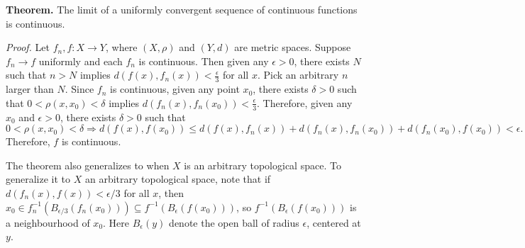 \documentclass[12pt]{article}
\begin{document}
{\bf Theorem.} The limit of a uniformly convergent sequence of continuous functions is continuous. 

\emph{Proof.} Let $f_n,f:X\rightarrow Y$, where $(X,\rho)$ and $(Y,d)$ are metric spaces. Suppose $f_n \rightarrow f$ uniformly and each $f_n$ is continuous. Then given any $\epsilon>0$, there exists $N$ such that $n>N$ implies $d(f(x),f_{n}(x)) < \frac{\epsilon}{3}$ for all $x$. Pick an arbitrary $n$ larger than $N$. Since $f_n$ is continuous, given any point $x_0$, there exists $\delta>0$ such that $0<\rho(x,x_0)<\delta$ implies $d(f_n(x), f_n(x_0))<\frac{\epsilon}{3}$. Therefore, given any $x_0$ and $\epsilon>0$, there exists $\delta>0$ such that 
\[0<\rho(x,x_0)<\delta\Rightarrow d(f(x),f(x_0)) \leq d(f(x),f_n(x)) + d(f_n(x),f_n(x_0)) + d(f_n(x_0),f(x_0)) < \epsilon.\]
Therefore, $f$ is continuous.

The theorem also generalizes to when $X$ is an arbitrary topological space. To generalize it to $X$ an arbitrary topological space, note that if $d(f_n(x),f(x))< \epsilon/3$ for all $x$, then
$x_0\in f_n^{-1}(B_{\epsilon/3}(f_n(x_0)))\subseteq f^{-1}(B_\epsilon(f(x_0)))$,
so $f^{-1}(B_\epsilon(f(x_0)))$ is a neighbourhood of $x_0$. Here $B_{\epsilon}(y)$ denote the open ball of radius $\epsilon$, centered at $y$. 
\end{document}

